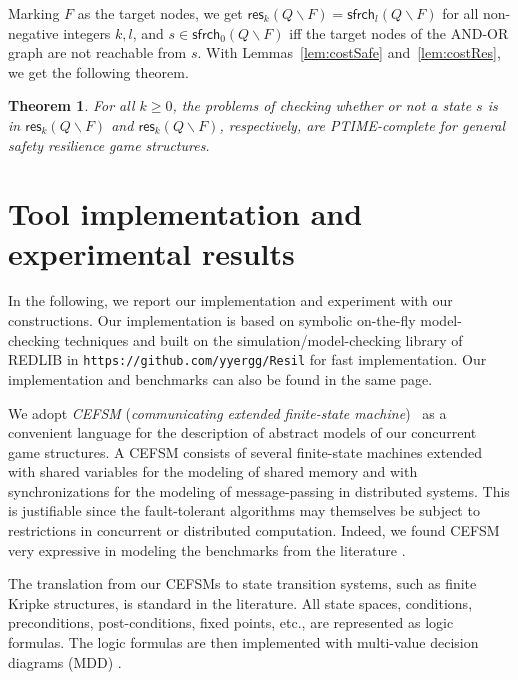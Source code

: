 \documentclass[times,10pt,twocolumn]{article}
\newtheorem{theorem}{Theorem}
\newcommand\res{\mathsf{res}}
\newcommand\safe{\mathsf{sfrch}}
\begin{document}
Marking $F$ as the target nodes, we get $\res_k(Q \smallsetminus F) = \safe_l(Q \smallsetminus F)$ for all non-negative integers $k,l$, and $s \in \safe_0(Q \smallsetminus F)$ iff the target nodes of the AND-OR graph are not reachable from $s$.
With Lemmas~\ref{lem:costSafe} and~\ref{lem:costRes}, we get the following theorem.

\begin{theorem}
For all $k \geq 0$, the problems of checking whether or not a state $s$ is in $\res_k(Q \smallsetminus F)$ and $\res_k(Q \smallsetminus F)$, respectively, are PTIME-complete for general safety resilience game structures.
\end{theorem}


\section{Tool implementation and experimental results \label{sec.imp.exp}} 

In the following, we report our implementation and experiment 
with our constructions.  
Our implementation is based on symbolic on-the-fly 
model-checking techniques 
and built on the simulation/model-checking library of REDLIB in 
\verb+https://github.com/yyergg/Resil+ for fast implementation.  
Our implementation and benchmarks can also be found in the same page. 

We adopt {\em CEFSM} 
({\em communicating extended finite-state machine})~\cite{BH89} 
as a convenient language for the description of abstract models of 
our concurrent game structures. 
A CEFSM consists of several finite-state machines extended with shared variables 
for the modeling of shared memory and 
with synchronizations for 
the modeling of message-passing in distributed systems.  
This is justifiable 
since the fault-tolerant algorithms may themselves be subject to  
restrictions in concurrent or distributed computation.  
Indeed, we found CEFSM very expressive in modeling the 
benchmarks from the literature \cite{CL99,RSB90}.  
\smallskip



The translation from our CEFSMs to state transition systems, 
such as finite Kripke structures, is standard in the literature. 
All state spaces, conditions, preconditions, post-conditions, 
fixed points, etc., are represented as logic formulas. 
The logic formulas are then implemented with multi-value decision diagrams 
(MDD) \cite{MD98}.  
\end{document}
